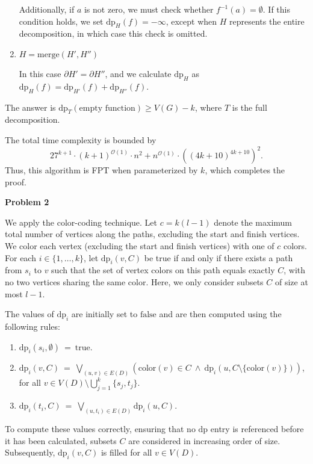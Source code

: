 \documentclass[12pt]{article}
\begin{document}
\begin{enumerate}
		      Additionally, if \(a\) is not zero, we must check whether
		      \(f^{-1}(a) = \emptyset\). If this condition holds, we set
		      \(\text{dp}_{H}(f) = -\infty\), except when \(H\) represents the
		      entire decomposition, in which case this check is omitted.
		
		\item \(H = \text{merge}(H', H'')\)
		      
		      In this case \(\partial H' = \partial H''\), and we calculate
		      \(\text{dp}_{H}\) as \(\text{dp}_{H}(f) = \text{dp}_{H'}(f) +
		      \text{dp}_{H''}(f)\).
	\end{enumerate}
	The answer is \(\text{dp}_{T}(\text{empty function}) \geqslant V(G) - k\),
	where \(T\) is the full decomposition.
	
	\medskip
	
	The total time complexity is bounded by
	\[ 27^{k + 1} \cdot (k + 1)^{\mathcal{O}(1)} \cdot n^{2} +
	n^{\mathcal{O}(1)} \cdot \left( (4k + 10)^{4k + 10} \right)^{2} \text{.} \]
	Thus, this algorithm is FPT when parameterized by \(k\), which completes the
	proof.
	
	\bigskip
	
	\textbf{Problem 2}
	
	\medskip
	
	We apply the color-coding technique. Let \(c = k(l - 1)\) denote the
	maximum total number of vertices along the paths, excluding the start and
	finish vertices. We color each vertex (excluding the start and finish
	vertices) with one of \(c\) colors. For each \(i \in \{1, \ldots, k\}\), let
	\(\text{dp}_{i}(v, C)\) be true if and only if there exists a path from
	\(s_{i}\) to \(v\) such that the set of vertex colors on this path equals
	exactly \(C\), with no two vertices sharing the same color. Here, we only
	consider subsets \(C\) of size at most \(l - 1\).
	
	\medskip
	
	The values of \(\text{dp}_{i}\) are initially set to \(\text{false}\) and
	are then computed using the following rules:
	\begin{enumerate}
		\item \(\text{dp}_{i}(s_{i}, \emptyset) \ = \ \text{true}\).
		\item \(\text{dp}_{i}(v, C) \ = \ \bigvee\limits_{(u, v) \in E(D)}
		      (\text{color}(v) \in C \ \wedge \ \text{dp}_{i}(u, C \setminus
		      \{\text{color}(v)\}))\), for all \(v \in V(D) \setminus
		      \bigcup\limits_{j = 1}^{k} \{s_{j}, t_{j}\}\).
		\item \(\text{dp}_{i}(t_{i}, C) \ = \ \bigvee\limits_{(u, t_{i}) \in
		      E(D)} \text{dp}_{i}(u, C)\).
	\end{enumerate}
	To compute these values correctly, ensuring that no \(\text{dp}\) entry is
	referenced before it has been calculated, subsets \(C\) are considered in
	increasing order of size. Subsequently, \(\text{dp}_{i}(v, C)\) is filled
	for all \(v \in V(D)\).
	
\end{document}
